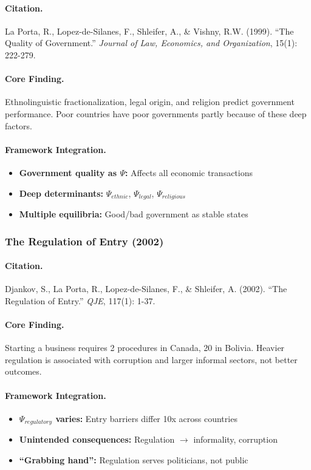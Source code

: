 \paragraph{Citation.}
La Porta, R., Lopez-de-Silanes, F., Shleifer, A., \& Vishny, R.W. (1999).
``The Quality of Government.''
\emph{Journal of Law, Economics, and Organization}, 15(1): 222-279.

\paragraph{Core Finding.}
Ethnolinguistic fractionalization, legal origin, and religion predict
government performance. Poor countries have poor governments partly
because of these deep factors.

\paragraph{Framework Integration.}
\begin{itemize}
  \item \textbf{Government quality as $\Psi$:} Affects all economic transactions
  \item \textbf{Deep determinants:} $\Psi_{ethnic}$, $\Psi_{legal}$, $\Psi_{religious}$
  \item \textbf{Multiple equilibria:} Good/bad government as stable states
\end{itemize}

\subsubsection{The Regulation of Entry (2002)}

\paragraph{Citation.}
Djankov, S., La Porta, R., Lopez-de-Silanes, F., \& Shleifer, A. (2002).
``The Regulation of Entry.'' \emph{QJE}, 117(1): 1-37.

\paragraph{Core Finding.}
Starting a business requires 2 procedures in Canada, 20 in Bolivia.
Heavier regulation is associated with corruption and larger informal sectors,
not better outcomes.

\paragraph{Framework Integration.}
\begin{itemize}
  \item \textbf{$\Psi_{regulatory}$ varies:} Entry barriers differ 10x across countries
  \item \textbf{Unintended consequences:} Regulation $\to$ informality, corruption
  \item \textbf{``Grabbing hand'':} Regulation serves politicians, not public
\end{itemize}

